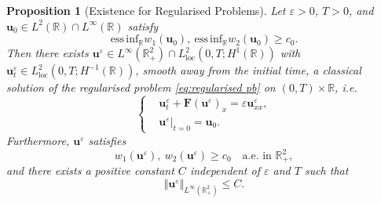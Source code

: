 \documentclass[11pt,a4paper,reqno]{amsart}
\numberwithin{equation}{section}
\newtheorem{prop}[lemma]{Proposition}
\theoremstyle{definition}
\theoremstyle{remark}
\newcommand{\bu}{\mathbf{u}}
\newcommand{\bF}{\mathbf{F}}
\newcommand{\essinf}{\mathrm{ess \, inf}}
\newcommand{\loc}{\mathrm{loc}}
\renewcommand{\leq}{\leqslant}
\renewcommand{\geq}{\geqslant}
\begin{document}
{\begin{prop}[Existence for Regularised Problems]\label{prop:approx pbms}
    Let $\varepsilon>0$, $T>0$, and $\bu_0 \in L^2(\mathbb{R}) \cap L^\infty(\mathbb{R})$ satisfy 
    \begin{equation*}
        \essinf_\mathbb{R} w_1(\bu_0) , ~  \essinf_\mathbb{R} w_2(\bu_0) \geq c_0. 
    \end{equation*}
    Then there exists $\bu^\varepsilon \in L^\infty(\mathbb{R}^2_+) \cap L^2_{\loc}(0,T;H^1(\mathbb{R}))$ with $\bu^\varepsilon_t \in L^2_{\loc}(0,T;H^{-1}(\mathbb{R}))$, smooth away from the initial time, a classical solution of the regularised problem \eqref{eq:regularised pb} on $(0,T)\times\mathbb{R}$, \textit{i.e.} 
    \begin{equation*}
    \left\lbrace\begin{aligned}
        &\bu^\varepsilon_t + \bF(\bu^\varepsilon)_x = \varepsilon  \bu^\varepsilon_{xx}, \\ 
        &\bu^\varepsilon|_{t=0} = \bu_0. 
    \end{aligned}\right.
\end{equation*}
Furthermore, $\bu^\varepsilon$ satisfies 
\begin{equation*}
        w_1(\bu^\varepsilon) , ~ w_2(\bu^\varepsilon) \geq c_0 \quad \text{a.e.~in }\mathbb{R}^2_+, 
    \end{equation*}
    and there exists a positive constant $C$ independent of $\varepsilon$ and $T$ such that 
    \begin{equation*}
        \Vert \bu^\varepsilon \Vert_{L^\infty(\mathbb{R}^2_+)} \leq C. 
    \end{equation*}
\end{prop}


}
\end{document}
